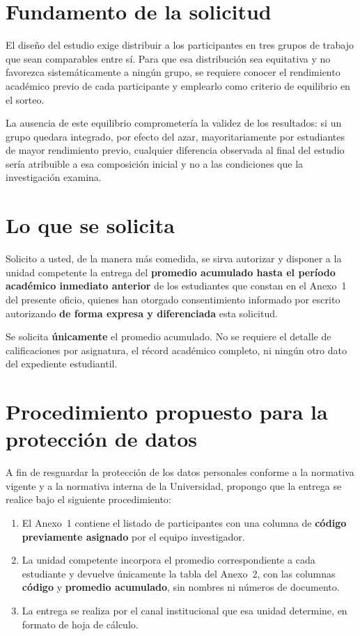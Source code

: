 \documentclass[11pt,a4paper]{article}
\newenvironment{recuadro}
	{\begin{lrbox}{\cajaguardada}\begin{minipage}{\dimexpr\textwidth-2\fboxsep\relax}\vspace{4pt}\small}
	{\vspace{4pt}\end{minipage}\end{lrbox}\par\vspace{4pt}\noindent\colorbox{grisclaro}{\usebox{\cajaguardada}}\par\vspace{6pt}}
\begin{document}
\section{Fundamento de la solicitud}

El dise\~no del estudio exige distribuir a los participantes en tres grupos de trabajo que sean comparables entre s\'i. Para que esa distribuci\'on sea equitativa y no favorezca sistem\'aticamente a ning\'un grupo, se requiere conocer el rendimiento acad\'emico previo de cada participante y emplearlo como criterio de equilibrio en el sorteo.

La ausencia de este equilibrio comprometer\'ia la validez de los resultados: si un grupo quedara integrado, por efecto del azar, mayoritariamente por estudiantes de mayor rendimiento previo, cualquier diferencia observada al final del estudio ser\'ia atribuible a esa composici\'on inicial y no a las condiciones que la investigaci\'on examina.

\section{Lo que se solicita}

Solicito a usted, de la manera m\'as comedida, se sirva autorizar y disponer a la unidad competente la entrega del \textbf{promedio acumulado hasta el per\'iodo acad\'emico inmediato anterior} de los estudiantes que constan en el Anexo~1 del presente oficio, quienes han otorgado consentimiento informado por escrito autorizando \textbf{de forma expresa y diferenciada} esta solicitud.

\begin{recuadro}
Se solicita \textbf{\'unicamente} el promedio acumulado. No se requiere el detalle de calificaciones por asignatura, el r\'ecord acad\'emico completo, ni ning\'un otro dato del expediente estudiantil.
\end{recuadro}

\section{Procedimiento propuesto para la protecci\'on de datos}

A fin de resguardar la protecci\'on de los datos personales conforme a la normativa vigente y a la normativa interna de la Universidad, propongo que la entrega se realice bajo el siguiente procedimiento:

\begin{enumerate}[label=\textbf{\arabic*.},leftmargin=1.0cm]
	\item El Anexo~1 contiene el listado de participantes con una columna de \textbf{c\'odigo previamente asignado} por el equipo investigador.
	\item La unidad competente incorpora el promedio correspondiente a cada estudiante y devuelve \'unicamente la tabla del Anexo~2, con las columnas \textbf{c\'odigo} y \textbf{promedio acumulado}, sin nombres ni n\'umeros de documento.
	\item La entrega se realiza por el canal institucional que esa unidad determine, en formato de hoja de c\'alculo.
\end{enumerate}
\end{document}
